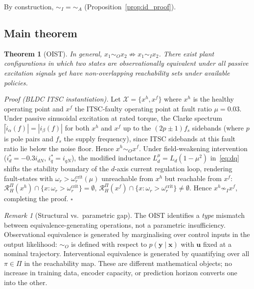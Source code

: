 \documentclass[10pt,twocolumn]{article}
\theoremstyle{plain}
\newtheorem{theorem}{Theorem}
\theoremstyle{definition}
\theoremstyle{remark}
\newtheorem{remark}{Remark}
\newcommand{\simA}{\sim_{\!A}}
\newcommand{\RHP}{\mathcal{R}_{H}^{\Pi}}
\newcommand{\calX}{\mathcal{X}}
\begin{document}
By construction, ${\sim_I} = {\simA}$ (Proposition~\ref{prop:id_proof}).

\subsection{Main theorem}

\begin{theorem}[OIST]
\label{thm:oist}
In general, $x_1 \sim_O x_2 \not\Rightarrow x_1 \sim_I x_2$. There exist
plant configurations in which two states are observationally equivalent under
all passive excitation signals yet have non-overlapping reachability sets
under available policies.
\end{theorem}

\textit{Proof (BLDC ITSC instantiation).}
Let $\calX = \{x^h, x^f\}$ where $x^h$ is the healthy operating point and
$x^f$ the ITSC-faulty operating point at fault ratio $\mu = 0.03$.
Under passive sinusoidal excitation at rated torque, the Clarke spectrum
$|\hat{i}_\alpha(f)| = |\hat{i}_\beta(f)|$ for both $x^h$ and $x^f$ up to
the $(2p \pm 1)f_s$ sidebands (where $p$ is pole pairs and $f_s$ the
supply frequency), since ITSC sidebands at this fault ratio lie below
the noise floor. Hence $x^h \sim_O x^f$. Under field-weakening intervention
($i_d^* = -0.3 i_{dN}$, $i_q^* = i_{qN}$), the modified inductance
$L_d^\mu = L_d(1 - \mu^2)$ in~\eqref{eq:dq} shifts the stability boundary
of the $d$-axis current regulation loop, rendering fault-states with
$\omega_r > \omega_r^{\text{crit}}(\mu)$ unreachable from $x^h$ but
reachable from $x^f$:
$\RHP(x^h) \cap \{x: \omega_r > \omega_r^{\text{crit}}\} = \emptyset$,
$\RHP(x^f) \cap \{x: \omega_r > \omega_r^{\text{crit}}\} \neq \emptyset$.
Hence $x^h \not\sim_I x^f$, completing the proof. $\square$

\begin{remark}[Structural vs.\ parametric gap]
The OIST identifies a \emph{type} mismatch between equivalence-generating
operations, not a parametric insufficiency. Observational equivalence is
generated by marginalising over control inputs in the output likelihood:
$\sim_O$ is defined with respect to $p(\bm{y} \mid \bm{x})$ with
$\bm{u}$ fixed at a nominal trajectory. Interventional equivalence is
generated by quantifying over all $\pi \in \Pi$ in the reachability map.
These are different mathematical objects; no increase in training data,
encoder capacity, or prediction horizon converts one into the other.
\end{remark}
\end{document}
